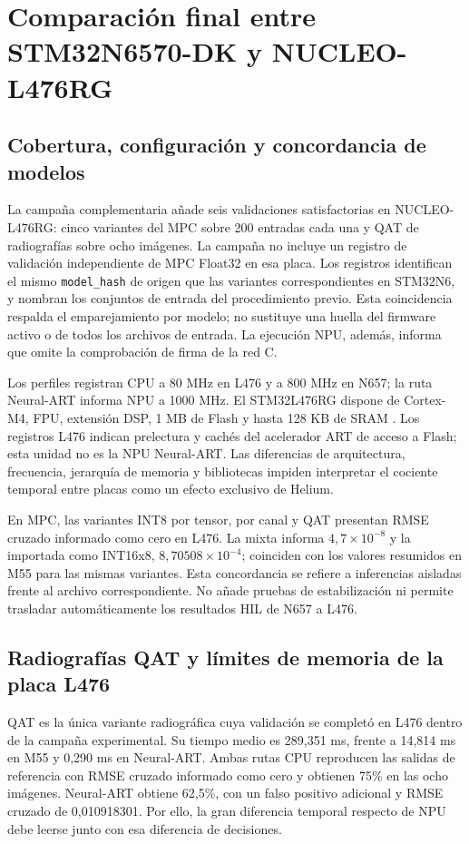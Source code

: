 \FloatBarrier
\section{Comparación final entre STM32N6570-DK y NUCLEO-L476RG}\label{sec:comparacion_placas}
\subsection{Cobertura, configuración y concordancia de modelos}
La campaña complementaria añade seis validaciones satisfactorias en NUCLEO-L476RG: cinco variantes del MPC sobre 200 entradas cada una y QAT de radiografías sobre ocho imágenes. La campaña no incluye un registro de validación independiente de MPC Float32 en esa placa. Los registros identifican el mismo \texttt{model\_\allowbreak hash} de origen que las variantes correspondientes en STM32N6, y nombran los conjuntos de entrada del procedimiento previo. Esta coincidencia respalda el emparejamiento por modelo; no sustituye una huella del firmware activo o de todos los archivos de entrada. La ejecución NPU, además, informa que omite la comprobación de firma de la red C.

Los perfiles registran CPU a 80 MHz en L476 y a 800 MHz en N657; la ruta Neural-ART informa NPU a 1000 MHz. El STM32L476RG dispone de Cortex-M4, FPU, extensión DSP, 1 MB de Flash y hasta 128 KB de SRAM \cite{res_stl476}. Los registros L476 indican prelectura y cachés del acelerador ART de acceso a Flash; esta unidad no es la NPU Neural-ART. Las diferencias de arquitectura, frecuencia, jerarquía de memoria y bibliotecas impiden interpretar el cociente temporal entre placas como un efecto exclusivo de Helium.


En MPC, las variantes INT8 por tensor, por canal y QAT presentan RMSE cruzado informado como cero en L476. La mixta informa $4{,}7\times10^{-8}$ y la importada como INT16x8, $8{,}70508\times10^{-4}$; coinciden con los valores resumidos en M55 para las mismas variantes. Esta concordancia se refiere a inferencias aisladas frente al archivo correspondiente. No añade pruebas de estabilización ni permite trasladar automáticamente los resultados HIL de N657 a L476.

\subsection{Radiografías QAT y límites de memoria de la placa L476}
QAT es la única variante radiográfica cuya validación se completó en L476 dentro de la campaña experimental. Su tiempo medio es 289,351 ms, frente a 14,814 ms en M55 y 0,290 ms en Neural-ART. Ambas rutas CPU reproducen las salidas de referencia con RMSE cruzado informado como cero y obtienen 75\% en las ocho imágenes. Neural-ART obtiene 62,5\%, con un falso positivo adicional y RMSE cruzado de 0,010918301. Por ello, la gran diferencia temporal respecto de NPU debe leerse junto con esa diferencia de decisiones.

